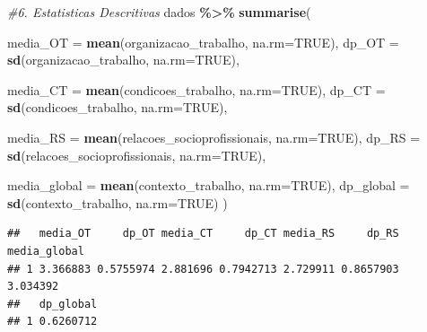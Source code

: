 \documentclass[
]{article}
\newenvironment{Shaded}{\begin{snugshade}}{\end{snugshade}}
\newcommand{\AttributeTok}[1]{\textcolor[rgb]{0.13,0.29,0.53}{#1}}
\newcommand{\CommentTok}[1]{\textcolor[rgb]{0.56,0.35,0.01}{\textit{#1}}}
\newcommand{\ConstantTok}[1]{\textcolor[rgb]{0.56,0.35,0.01}{#1}}
\newcommand{\FunctionTok}[1]{\textcolor[rgb]{0.13,0.29,0.53}{\textbf{#1}}}
\newcommand{\NormalTok}[1]{#1}
\newcommand{\SpecialCharTok}[1]{\textcolor[rgb]{0.81,0.36,0.00}{\textbf{#1}}}
\begin{document}
\begin{Shaded}
\begin{Highlighting}[]
\CommentTok{\#6. Estatisticas Descritivas}
\NormalTok{dados }\SpecialCharTok{\%\textgreater{}\%}
  \FunctionTok{summarise}\NormalTok{(}
    
    \AttributeTok{media\_OT =} \FunctionTok{mean}\NormalTok{(organizacao\_trabalho, }\AttributeTok{na.rm=}\ConstantTok{TRUE}\NormalTok{),}
    \AttributeTok{dp\_OT =} \FunctionTok{sd}\NormalTok{(organizacao\_trabalho, }\AttributeTok{na.rm=}\ConstantTok{TRUE}\NormalTok{),}
    
    \AttributeTok{media\_CT =} \FunctionTok{mean}\NormalTok{(condicoes\_trabalho, }\AttributeTok{na.rm=}\ConstantTok{TRUE}\NormalTok{),}
    \AttributeTok{dp\_CT =} \FunctionTok{sd}\NormalTok{(condicoes\_trabalho, }\AttributeTok{na.rm=}\ConstantTok{TRUE}\NormalTok{),}
    
    \AttributeTok{media\_RS =} \FunctionTok{mean}\NormalTok{(relacoes\_socioprofissionais, }\AttributeTok{na.rm=}\ConstantTok{TRUE}\NormalTok{),}
    \AttributeTok{dp\_RS =} \FunctionTok{sd}\NormalTok{(relacoes\_socioprofissionais, }\AttributeTok{na.rm=}\ConstantTok{TRUE}\NormalTok{),}
    
    \AttributeTok{media\_global =} \FunctionTok{mean}\NormalTok{(contexto\_trabalho, }\AttributeTok{na.rm=}\ConstantTok{TRUE}\NormalTok{),}
    \AttributeTok{dp\_global =} \FunctionTok{sd}\NormalTok{(contexto\_trabalho, }\AttributeTok{na.rm=}\ConstantTok{TRUE}\NormalTok{)}
\NormalTok{  )}
\end{Highlighting}
\end{Shaded}

\begin{verbatim}
##   media_OT     dp_OT media_CT     dp_CT media_RS     dp_RS media_global
## 1 3.366883 0.5755974 2.881696 0.7942713 2.729911 0.8657903     3.034392
##   dp_global
## 1 0.6260712
\end{verbatim}
\end{document}
